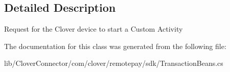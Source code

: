 \subsection{Detailed Description}
Request for the Clover device to start a Custom Activity 



The documentation for this class was generated from the following file\+:\begin{DoxyCompactItemize}
\item 
lib/\+Clover\+Connector/com/clover/remotepay/sdk/Transaction\+Beans.\+cs\end{DoxyCompactItemize}
